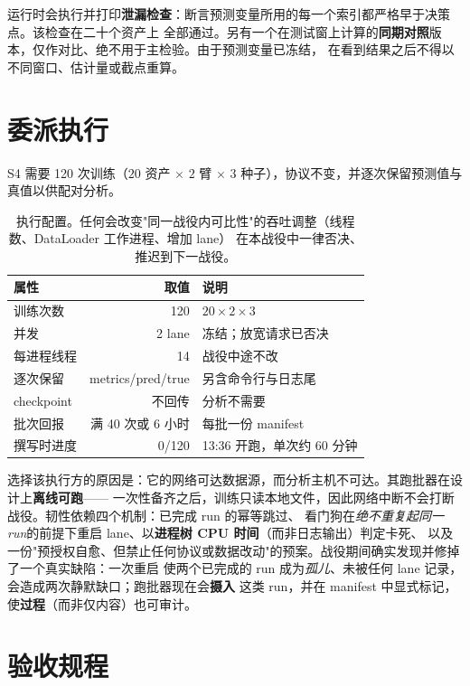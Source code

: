\documentclass[conference]{IEEEtran}
\begin{document}
运行时会执行并打印\textbf{泄漏检查}：断言预测变量所用的每一个索引都严格早于决策点。该检查在二十个资产上
全部通过。另有一个在测试窗上计算的\textbf{同期对照}版本，仅作对比、绝不用于主检验。由于预测变量已冻结，
在看到结果之后不得以不同窗口、估计量或截点重算。

\section{委派执行}
\label{sec:exec}

S4 需要 120 次训练（$20$ 资产 $\times$ $2$ 臂 $\times$ $3$ 种子），协议不变，并逐次保留预测值与真值以供配对分析。

\begin{table}[!t]
\centering
\small
\begin{tabular}{@{}lrl@{}}
\toprule
属性 & 取值 & 说明 \\
\midrule
训练次数 & 120 & $20 \times 2 \times 3$ \\
并发 & 2 lane & 冻结；放宽请求已否决 \\
每进程线程 & 14 & 战役中途不改 \\
逐次保留 & metrics/pred/true & 另含命令行与日志尾 \\
checkpoint & 不回传 & 分析不需要 \\
批次回报 & 满 40 次或 6 小时 & 每批一份 manifest \\
撰写时进度 & 0/120 & 13:36 开跑，单次约 60 分钟 \\
\bottomrule
\end{tabular}
\caption{执行配置。任何会改变"同一战役内可比性"的吞吐调整（线程数、DataLoader 工作进程、增加 lane）
在本战役中一律否决、推迟到下一战役。}
\label{tab:exec}
\end{table}

选择该执行方的原因是：它的网络可达数据源，而分析主机不可达。其跑批器在设计上\textbf{离线可跑}——
一次性备齐之后，训练只读本地文件，因此网络中断不会打断战役。韧性依赖四个机制：已完成 run 的幂等跳过、
看门狗在\emph{绝不重复起同一 run}的前提下重启 lane、以\textbf{进程树 CPU 时间}（而非日志输出）判定卡死、
以及一份"预授权自愈、但禁止任何协议或数据改动"的预案。战役期间确实发现并修掉了一个真实缺陷：一次重启
使两个已完成的 run 成为\emph{孤儿}、未被任何 lane 记录，会造成两次静默缺口；跑批器现在会\textbf{摄入}
这类 run，并在 manifest 中显式标记，使\textbf{过程}（而非仅内容）也可审计。

\section{验收规程}
\label{sec:verify}
\end{document}

